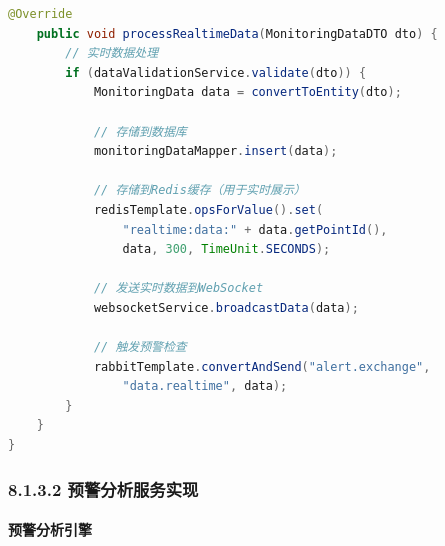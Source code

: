 \begin{lstlisting}[language=Java]
    @Override
    public void processRealtimeData(MonitoringDataDTO dto) {
        // 实时数据处理
        if (dataValidationService.validate(dto)) {
            MonitoringData data = convertToEntity(dto);
            
            // 存储到数据库
            monitoringDataMapper.insert(data);
            
            // 存储到Redis缓存（用于实时展示）
            redisTemplate.opsForValue().set(
                "realtime:data:" + data.getPointId(), 
                data, 300, TimeUnit.SECONDS);
            
            // 发送实时数据到WebSocket
            websocketService.broadcastData(data);
            
            // 触发预警检查
            rabbitTemplate.convertAndSend("alert.exchange", 
                "data.realtime", data);
        }
    }
}
\end{lstlisting}

\subsubsection{8.1.3.2
预警分析服务实现}\label{ux9884ux8b66ux5206ux6790ux670dux52a1ux5b9eux73b0}

\paragraph{预警分析引擎}\label{ux9884ux8b66ux5206ux6790ux5f15ux64ce}

